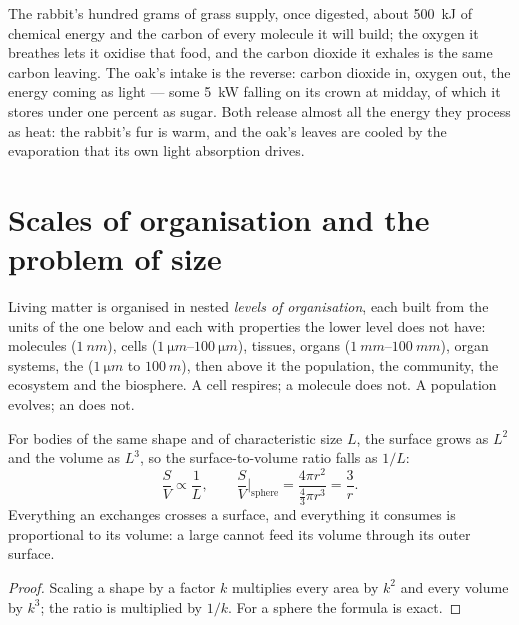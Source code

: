 \begin{example}\label{ex:b1:organism-environment:rabbitoak}
The rabbit's hundred grams of grass supply, once digested, about
\qty{500}{kJ} of chemical energy and the carbon of every molecule it
will build; the oxygen it breathes lets it oxidise that food, and the
carbon dioxide it exhales is the same carbon leaving. The oak's intake is
the reverse: carbon dioxide in, oxygen out, the energy coming as light
--- some \qty{5}{kW} falling on its crown at midday, of which it stores
under one percent as sugar. Both release almost all the energy they
process as heat: the rabbit's fur is warm, and the oak's leaves are
cooled by the evaporation that its own light absorption drives.
\end{example}

\section{Scales of organisation and the problem of size}

\begin{definition}\label{def:b1:organism-environment:levels}
Living matter is organised in nested \emph{levels of
organisation}, each built from the units
of the one below and each with properties the lower level does not have:
molecules ($\qty{1}{nm}$), cells ($\qtyrange{1}{100}{\micro m}$),
tissues, organs ($\qtyrange{1}{100}{mm}$), organ systems, the 
($\qty{1}{\micro m}$ to $\qty{100}{m}$), then above it the population,
the community, the ecosystem and the biosphere. A cell respires; a
molecule does not. A population evolves; an  does not.
\end{definition}

\begin{proposition}\label{prop:b1:organism-environment:sv}
For bodies of the same shape and of characteristic size $L$, the surface
grows as $L^2$ and the volume as $L^3$, so the surface-to-volume ratio
falls as $1/L$:
\[
\frac{S}{V} \propto \frac{1}{L}, \qquad
\frac{S}{V}\Big|_{\text{sphere}} = \frac{4\pi r^2}{\tfrac{4}{3}\pi r^3} = \frac{3}{r}.
\]
Everything an  exchanges crosses a surface, and everything it
consumes is proportional to its volume: a large  cannot feed
its volume through its outer surface.
\end{proposition}
\begin{proof}
Scaling a shape by a factor $k$ multiplies every area by $k^2$ and every
volume by $k^3$; the ratio is multiplied by $1/k$. For a sphere the
formula is exact.
\end{proof}

